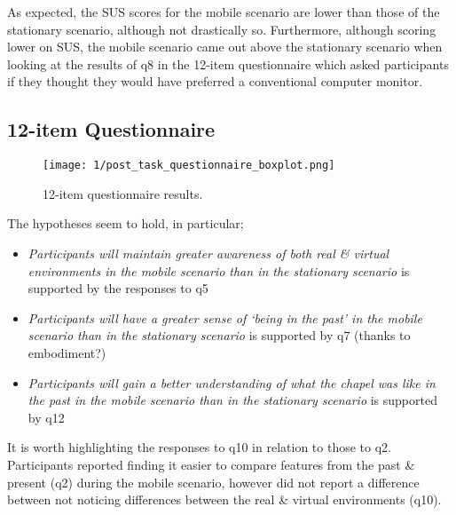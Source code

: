 As expected, the SUS scores for the mobile scenario are lower than those of the stationary scenario, although not drastically so. Furthermore, although scoring lower on SUS, the mobile scenario came out above the stationary scenario when looking at the results of q8 in the 12-item questionnaire which asked participants if they thought they would have preferred a conventional computer monitor.

\pagebreak

\subsection{12-item Questionnaire}

\begin{figure}[h]
	\begin{center}
		\texttt{[image: 1/post\_task\_questionnaire\_boxplot.png]}
		\caption{12-item questionnaire results.}
		\label{12-item_boxplot}
	\end{center}
\end{figure}

The hypotheses seem to hold, in particular;

\begin{itemize}
	\item \textit{Participants will maintain greater awareness of both real \& virtual environments in the mobile scenario than in the stationary scenario} is supported by the responses to q5
	\item \textit{Participants will have a greater sense of `being in the past' in the mobile scenario than in the stationary scenario} is supported by q7 (thanks to embodiment?)
	\item \textit{Participants will gain a better understanding of what the chapel was like in the past in the mobile scenario than in the stationary scenario} is supported by q12
\end{itemize}

It is worth highlighting the responses to q10 in relation to those to q2. Participants reported finding it easier to compare features from the past \& present (q2) during the mobile scenario, however did not report a difference between not noticing differences between the real \& virtual environments (q10).




